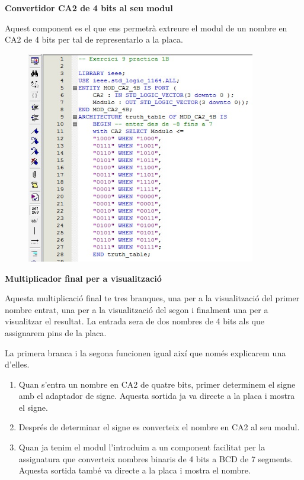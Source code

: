 \documentclass[12pt, a4papre]{article}
\begin{document}
	\textbf{\large{Convertidor CA2 de 4 bits al seu modul}}
	
	Aquest component es el que ens permetrà extreure el modul de un nombre en CA2 de 4 bits per tal de representarlo a la placa.
	
	\begin{center}
	\begin{figure}[H]
		\begin{center}
		\includegraphics[width=100mm]{ConvCA2_4aMOD.jpeg}
		\end{center}
	\end{figure}
	
	\end{center}
	
	\textbf{\large{Multiplicador final per a visualització}}
	
	Aquesta multiplicació final te tres branques, una per a la visualització del primer nombre entrat, una per a la visualització del segon i finalment una per a visualitzar el resultat. La entrada sera de dos nombres de 4 bits als que assignarem pins de la placa. 
	
	La primera branca i la segona funcionen igual així que només explicarem una d'elles. 
	\begin{enumerate}
	\item Quan s'entra un nombre en CA2 de quatre bits, primer determinem el signe amb el adaptador de signe. Aquesta sortida ja va directe a la placa i mostra el signe.
	\item Després de determinar el signe es converteix el nombre en CA2 al seu modul.
	\item Quan ja tenim el modul l'introduim a un component facilitat per la assignatura que converteix nombres binaris de 4 bits a BCD de 7 segments. Aquesta sortida també va directe a la placa i mostra el nombre.
	\end{enumerate}
	
\end{document}
